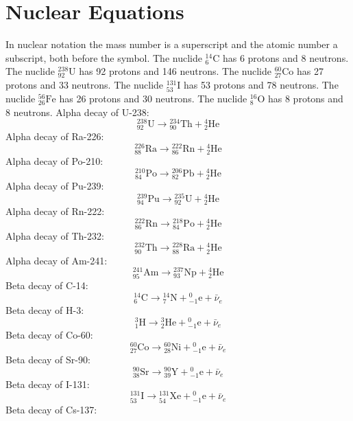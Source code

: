 \documentclass[11pt]{article}
\begin{document}
\section*{Nuclear Equations}
In nuclear notation the mass number is a superscript and the atomic number a subscript, both before the symbol.
The nuclide \label{eq072}${}^{14}_{6}\mathrm{C}$ has 6 protons and 8 neutrons. The nuclide \label{eq073}${}^{238}_{92}\mathrm{U}$ has 92 protons and 146 neutrons. The nuclide \label{eq074}${}^{60}_{27}\mathrm{Co}$ has 27 protons and 33 neutrons. The nuclide \label{eq075}${}^{131}_{53}\mathrm{I}$ has 53 protons and 78 neutrons. The nuclide \label{eq076}${}^{56}_{26}\mathrm{Fe}$ has 26 protons and 30 neutrons. The nuclide \label{eq077}${}^{16}_{8}\mathrm{O}$ has 8 protons and 8 neutrons.
Alpha decay of U-238:\nopagebreak
\label{eq078}\[
  {}^{238}_{92}\mathrm{U} \longrightarrow {}^{234}_{90}\mathrm{Th} + {}^{4}_{2}\mathrm{He}
\]
Alpha decay of Ra-226:\nopagebreak
\label{eq079}\[
  {}^{226}_{88}\mathrm{Ra} \longrightarrow {}^{222}_{86}\mathrm{Rn} + {}^{4}_{2}\mathrm{He}
\]
Alpha decay of Po-210:\nopagebreak
\label{eq080}\[
  {}^{210}_{84}\mathrm{Po} \longrightarrow {}^{206}_{82}\mathrm{Pb} + {}^{4}_{2}\mathrm{He}
\]
Alpha decay of Pu-239:\nopagebreak
\label{eq081}\[
  {}^{239}_{94}\mathrm{Pu} \longrightarrow {}^{235}_{92}\mathrm{U} + {}^{4}_{2}\mathrm{He}
\]
Alpha decay of Rn-222:\nopagebreak
\label{eq082}\[
  {}^{222}_{86}\mathrm{Rn} \longrightarrow {}^{218}_{84}\mathrm{Po} + {}^{4}_{2}\mathrm{He}
\]
Alpha decay of Th-232:\nopagebreak
\label{eq083}\[
  {}^{232}_{90}\mathrm{Th} \longrightarrow {}^{228}_{88}\mathrm{Ra} + {}^{4}_{2}\mathrm{He}
\]
Alpha decay of Am-241:\nopagebreak
\label{eq084}\[
  {}^{241}_{95}\mathrm{Am} \longrightarrow {}^{237}_{93}\mathrm{Np} + {}^{4}_{2}\mathrm{He}
\]
Beta decay of C-14:\nopagebreak
\label{eq085}\[
  {}^{14}_{6}\mathrm{C} \longrightarrow {}^{14}_{7}\mathrm{N} + {}^{0}_{-1}\mathrm{e} + \bar{\nu}_{e}
\]
Beta decay of H-3:\nopagebreak
\label{eq086}\[
  {}^{3}_{1}\mathrm{H} \longrightarrow {}^{3}_{2}\mathrm{He} + {}^{0}_{-1}\mathrm{e} + \bar{\nu}_{e}
\]
Beta decay of Co-60:\nopagebreak
\label{eq087}\[
  {}^{60}_{27}\mathrm{Co} \longrightarrow {}^{60}_{28}\mathrm{Ni} + {}^{0}_{-1}\mathrm{e} + \bar{\nu}_{e}
\]
Beta decay of Sr-90:\nopagebreak
\label{eq088}\[
  {}^{90}_{38}\mathrm{Sr} \longrightarrow {}^{90}_{39}\mathrm{Y} + {}^{0}_{-1}\mathrm{e} + \bar{\nu}_{e}
\]
Beta decay of I-131:\nopagebreak
\label{eq089}\[
  {}^{131}_{53}\mathrm{I} \longrightarrow {}^{131}_{54}\mathrm{Xe} + {}^{0}_{-1}\mathrm{e} + \bar{\nu}_{e}
\]
Beta decay of Cs-137:\nopagebreak
\end{document}
